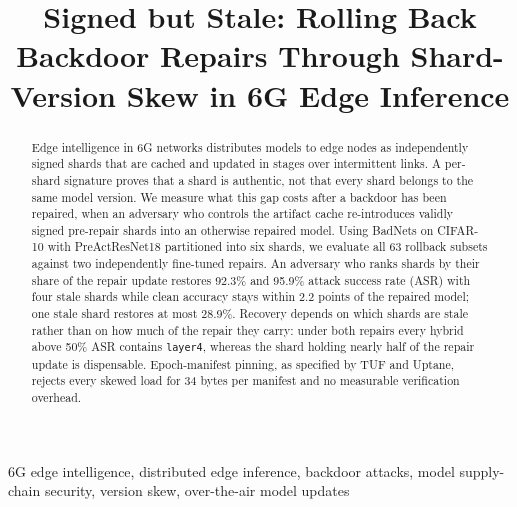 \documentclass[conference,a4paper]{IEEEtran}  %
\newcommand{\todo}[1]{\textcolor{red}{[TODO: #1]}}
\newif\ifincludeanp      \includeanpfalse   %
\begin{document}
\title{Signed but Stale: Rolling Back Backdoor Repairs Through Shard-Version Skew in 6G Edge Inference}

\author{
}

\maketitle

\begin{abstract}
Edge intelligence in 6G networks distributes models to edge nodes as
independently signed shards that are cached and updated in stages over
intermittent links. A per-shard signature proves that a shard is authentic,
not that every shard belongs to the same model version. We measure what this
gap costs after a backdoor has been repaired, when an adversary who controls
the artifact cache re-introduces validly signed pre-repair shards into an
otherwise repaired model. Using BadNets on CIFAR-10 with PreActResNet18
partitioned into six shards, we evaluate all 63 rollback subsets against two
independently fine-tuned repairs. An adversary who ranks shards by their share
of the repair update restores 92.3\% and 95.9\% attack success rate (ASR) with
four stale shards while clean accuracy stays within 2.2 points of the repaired
model; one stale shard restores at most 28.9\%. Recovery depends on which
shards are stale rather than on how much of the repair they carry: under both
repairs every hybrid above 50\% ASR contains \texttt{layer4}, whereas the
shard holding nearly half of the repair update is dispensable. Epoch-manifest
pinning, as specified by TUF and Uptane, rejects every skewed load for 34
bytes per manifest and no measurable verification overhead.
\ifincludeanp
\todo{one-sentence ANP result, from measured numbers only}
\fi
\end{abstract}

\begin{IEEEkeywords}
6G edge intelligence, distributed edge inference, backdoor attacks,
model supply-chain security, version skew, over-the-air model updates
\end{IEEEkeywords}
\end{document}

